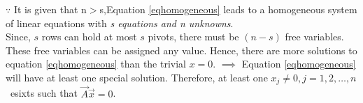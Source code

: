 \documentclass[journal,12pt,twocolumn]{IEEEtran}
\begin{document}
$\because$ It is given that n$>$s,\newline Equation \eqref{eqhomogeneous} leads to a homogeneous system of linear equations with \textit{s equations and n unknowns}.\\
Since, $s$ rows can hold at most $s$ pivots, there must be $(n-s)$ free variables.\newline
These free variables can be assigned any value. Hence, there are more solutions to equation \eqref{eqhomogeneous} than the trivial $x=0$.\newline
$\implies$ Equation \eqref{eqhomogeneous} will have at least one special solution. \newline
Therefore, at least one $x_j\neq0, j=1,2,\dots,n$\ esixts such that $\vec{A}\vec{x}=0$.
\end{document}
